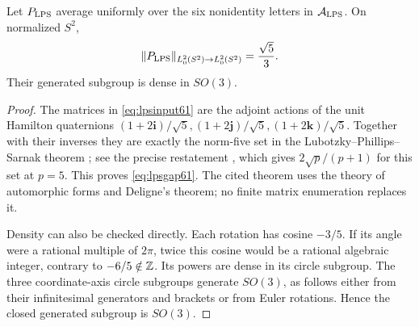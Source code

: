 \begin{lemma}\label{lem:lpsgap61}
Let $P_{\rm LPS}$ average uniformly over the six nonidentity letters
in $\mathcal A_{\rm LPS}$. On normalized $S^2$,
\begin{equation}\label{eq:lpsgap61}
 \lVert P_{\rm LPS}\rVert_{L^2_0(S^2)\to L^2_0(S^2)}=\frac{\sqrt5}{3}.
\end{equation}
Their generated subgroup is dense in $SO(3)$.
\end{lemma}
\begin{proof}
The matrices in \eqref{eq:lpsinput61} are the adjoint actions of the
unit Hamilton quaternions
$(1+2\mathbf i)/\sqrt5,(1+2\mathbf j)/\sqrt5,(1+2\mathbf k)/\sqrt5$.
Together with their inverses they are exactly the norm-five set in the
Lubotzky--Phillips--Sarnak theorem \cite[Theorems~1.3 and~1.5]{LPS61};
see the precise restatement \cite[Theorem~1.1]{PLP61pre}, which gives
$2\sqrt p/(p+1)$ for this set at $p=5$. This proves
\eqref{eq:lpsgap61}. The cited theorem uses the theory of automorphic
forms and Deligne's theorem; no finite matrix enumeration replaces it.

Density can also be checked directly. Each rotation has cosine
$-3/5$. If its angle were a rational multiple of $2\pi$, twice this
cosine would be a rational algebraic integer, contrary to $-6/5\notin\mathbb Z$.
Its powers are dense in its circle subgroup. The three coordinate-axis
circle subgroups generate $SO(3)$, as follows either from their
infinitesimal generators and brackets or from Euler rotations. Hence
the closed generated subgroup is $SO(3)$.
\end{proof}

